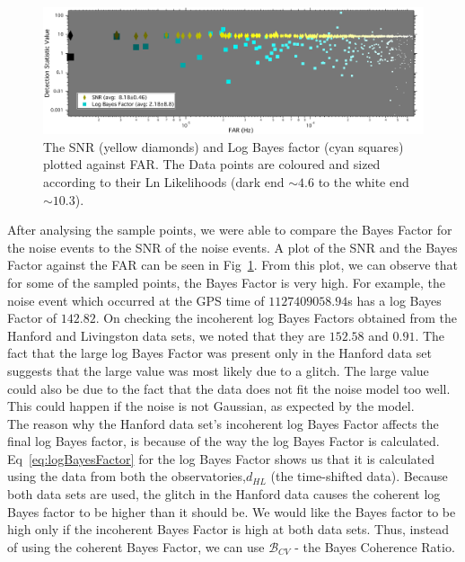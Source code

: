 \documentclass{article}
\begin{document}
          \begin{figure}[h]
          	\centering
          	\includegraphics[width=1\textwidth]{Figures/DetectionStatVSfar_bF.pdf} 
          	\caption{The SNR (yellow diamonds) and Log Bayes factor (cyan squares) plotted against FAR. The Data points are coloured and sized according to their Ln Likelihoods (dark end $\sim4.6 $ to the white end $\sim10.3$).}
          	\label{Fig:BayesVSFAR}
          \end{figure}
         
 
 After analysing the sample points, we were able to compare the Bayes Factor for the noise events to the SNR of the noise events. A plot of the SNR and the Bayes Factor against the FAR can be seen in Fig~\ref{Fig:BayesVSFAR}. From this plot, we can observe that for some of the sampled points, the Bayes Factor is very high. For example, the noise event which occurred at the GPS time of $1127409058.94$s has a log Bayes Factor of $142.82$. On checking the incoherent log Bayes Factors obtained from the Hanford and Livingston data sets, we noted that they are $152.58$ and $0.91$. The fact that the large log Bayes Factor was present only in the Hanford data set suggests that the large value was most likely due to a glitch. The large value could also be due to the fact that the data does not fit the noise model too well. This could happen if the noise is not Gaussian, as expected by the model. \\ 
 
 
 The reason why the Hanford data set's incoherent log Bayes Factor affects the final log Bayes factor, is because of the way the log Bayes Factor is calculated. Eq~\ref{eq:logBayesFactor} for the log Bayes Factor shows us that it is calculated using the data from both the observatories,$d_{HL}$ (the time-shifted data). Because both data sets are used, the glitch in the Hanford data causes the coherent log Bayes factor to be higher than it should be. We would like the Bayes factor to be high only if the incoherent Bayes Factor is high at both data sets. Thus, instead of using the coherent Bayes Factor, we can use $\mathcal{B}_{CV}$ - the Bayes Coherence Ratio.\\
 
\end{document}
